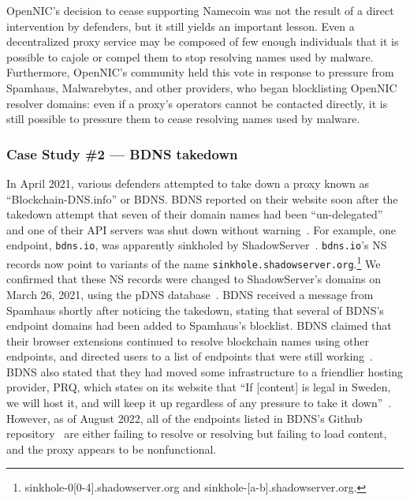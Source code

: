 OpenNIC's decision to cease supporting Namecoin was not the 
result of a direct intervention by defenders, but it still 
yields an important lesson. Even a decentralized proxy 
service may be composed of few enough individuals that it is 
possible to cajole or compel them to stop resolving names 
used by malware. Furthermore, OpenNIC's community held this 
vote in response to pressure from Spamhaus, Malwarebytes, and 
other providers, who began blocklisting OpenNIC resolver 
domains: even if a proxy's operators cannot be contacted 
directly, it is still possible to pressure them to cease 
resolving names used by malware.

\subsubsection{Case Study \#2 --- BDNS takedown}

In April 2021, various defenders attempted to take down a proxy known as 
``Blockchain-DNS.info'' or BDNS. BDNS reported on their website soon after the 
takedown attempt 
that seven of their domain names had been ``un-delegated'' 
and one of their API servers was shut down without 
warning~\cite{blockchain-dns-info-wayback}. For example, one 
endpoint, \texttt{bdns.io}, was 
apparently sinkholed by ShadowServer~\cite{shadowserver}. 
\texttt{bdns.io}'s NS 
records now point to variants of the name 
\texttt{sinkhole.shadowserver.org}.\footnote{sinkhole-0[0-4].shadowserver.org
	and sinkhole-[a-b].shadowserver.org.} We confirmed that these 
NS records were 
changed to ShadowServer's domains on March 26, 2021, using 
the pDNS 
database~\cite{domaintools_pdns}. BDNS 
received a message from Spamhaus shortly after noticing the 
takedown, stating that several of 
BDNS's endpoint domains had been added to Spamhaus's 
blocklist. BDNS 
claimed that their browser extensions continued to resolve 
blockchain names using other endpoints, and directed users to 
a list of endpoints that were still 
working~\cite{github_bdns_wayback}. BDNS also stated that 
they had moved some infrastructure to a friendlier hosting 
provider, PRQ, which states on its website that ``If 
[content] is legal in Sweden, we will host it, and will keep 
it up regardless of any pressure to take it 
down''~\cite{prq}. However, as of August 2022, all of the endpoints 
listed in BDNS's 
Github repository~\cite{github_bdns_wayback} are either 
failing to resolve or resolving but failing to 
load content, and the proxy appears to be nonfunctional.

